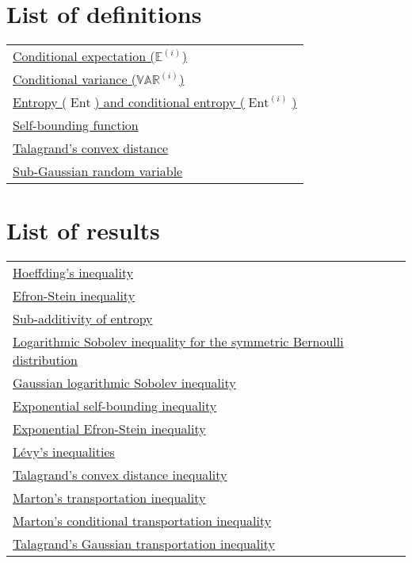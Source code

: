 \documentclass[reqno]{amsproc}
\newcommand{\E}{\mathbb{E}} %
\newcommand{\var}{\mathbb{VAR}} %
\DeclareMathOperator{\Ent}{Ent} %
\begin{document}
\appendix
\newpage


\section*{List of definitions}
	\begin{tabular}{l}
		\hyperref[thm:ESI]{Conditional expectation ($\E^{(i)}$)}\\
		\hyperref[thm:ESI]{Conditional variance ($\var^{(i)}$)}\\
		\hyperref[thm:sub_add_entropy]{Entropy ($\Ent$) and conditional entropy ($\Ent^{(i)}$)}\\
		\hyperref[thm:exp_self_bound_ineq]{Self-bounding function}\\
		\hyperref[thm:tal]{Talagrand's convex distance}\\
		\hyperref[lem:transp]{Sub-Gaussian random variable}
	\end{tabular}
\section*{List of results}
	\begin{tabular}{l}
		\hyperref[thm:hoeffding]{Hoeffding's inequality}\\
		\hyperref[thm:ESI]{Efron-Stein inequality}\\
		\hyperref[thm:sub_add_entropy]{Sub-additivity of entropy}\\
		\hyperref[thm:log_Sob_ineq_sym_Bernoulli]{Logarithmic Sobolev inequality for the symmetric Bernoulli distribution}\\
		\hyperref[thm:Gaussian_log_Sob_ineq]{Gaussian logarithmic Sobolev inequality}\\
		\hyperref[thm:sub_add_entropy]{Exponential self-bounding inequality}\\
		\hyperref[thm:exp_efron_stein]{Exponential Efron-Stein inequality}\\
		\hyperref[thm:levy]{L\'evy's inequalities}\\
		\hyperref[thm:tal]{Talagrand's convex distance inequality}\\
		\hyperref[thm:marton]{Marton's transportation inequality}\\
		\hyperref[thm:marton_cond]{Marton's conditional transportation inequality}\\
		\hyperref[thm:transp_gaussian]{Talagrand's Gaussian transportation inequality}
	\end{tabular}
\end{document}
